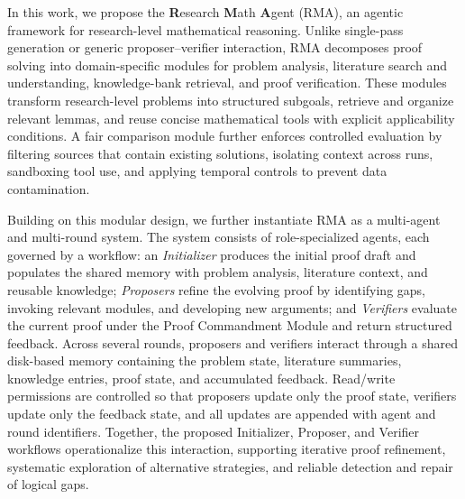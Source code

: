 \documentclass{article}
\newcommand{\modelname}{\textsc{RMA}\xspace}
\begin{document}
In this work, we propose the \textbf{R}esearch \textbf{M}ath \textbf{A}gent (\modelname), an agentic framework for research-level mathematical reasoning. Unlike single-pass generation or generic proposer--verifier interaction, \modelname decomposes proof solving into domain-specific modules for problem analysis, literature search and understanding, knowledge-bank retrieval, and proof verification. These modules transform research-level problems into structured subgoals, retrieve and organize relevant lemmas, and reuse concise mathematical tools with explicit applicability conditions. A fair comparison module further enforces controlled evaluation by filtering sources that contain existing solutions, isolating context across runs, sandboxing tool use, and applying temporal controls to prevent data contamination.

Building on this modular design, we further instantiate \modelname as a multi-agent and multi-round system. The system consists of role-specialized agents, each governed by a workflow: an \emph{Initializer} produces the initial proof draft and populates the shared memory with problem analysis, literature context, and reusable knowledge; \emph{Proposers} refine the evolving proof by identifying gaps, invoking relevant modules, and developing new arguments; and \emph{Verifiers} evaluate the current proof under the Proof Commandment Module and return structured feedback. Across several rounds, proposers and verifiers interact through a shared disk-based memory containing the problem state, literature summaries, knowledge entries, proof state, and accumulated feedback. Read/write permissions are controlled so that proposers update only the proof state, verifiers update only the feedback state, and all updates are appended with agent and round identifiers. Together, the proposed Initializer, Proposer, and Verifier workflows operationalize this interaction, supporting iterative proof refinement, systematic exploration of alternative strategies, and reliable detection and repair of logical gaps.
\end{document}
